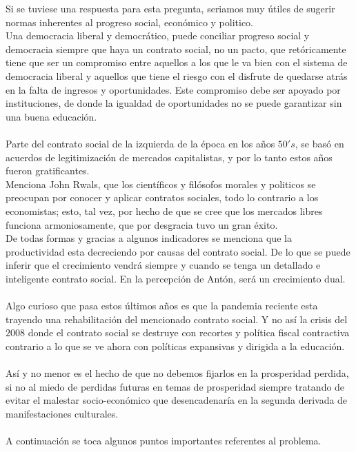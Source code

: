 \begin{multicols}{2}
Si se tuviese una respuesta para esta pregunta, seriamos muy útiles de sugerir normas inherentes al progreso social, económico y politico. \\
Una democracia liberal y democrático, puede conciliar progreso social y democracia siempre que haya un contrato social, no un pacto, que retóricamente tiene que ser un compromiso entre aquellos a los que le va bien con el sistema de democracia liberal y aquellos que tiene el riesgo con el disfrute de quedarse atrás en la falta de ingresos y oportunidades. Este compromiso debe ser apoyado por instituciones, de donde la igualdad de oportunidades no se puede garantizar sin una buena educación. \\\\
Parte del contrato social de la izquierda de la época en los años $50's$, se basó en acuerdos de legitimización de mercados capitalistas, y por lo tanto estos años fueron gratificantes. \\
Menciona John Rwals, que los científicos y filósofos morales y politicos se preocupan por conocer y aplicar contratos sociales, todo lo contrario a los economistas; esto, tal vez, por hecho de que se cree que los mercados libres funciona armoniosamente, que por desgracia tuvo un gran éxito.\\
De todas formas y gracias a algunos indicadores se menciona que la productividad esta decreciendo por causas del contrato social. De lo que se puede inferir que el crecimiento vendrá siempre y cuando se tenga un detallado e inteligente contrato social. En la percepción de Antón, será un crecimiento dual.\\\\
Algo curioso que pasa estos últimos años es que la pandemia reciente esta trayendo una rehabilitación del mencionado contrato social. Y no así la crisis del $2008$ donde el contrato social se destruye con recortes y política fiscal contractiva contrario a lo que se ve ahora con políticas expansivas y dirigida a la educación.\\\\
Así y no menor es el hecho de que no debemos fijarlos en la prosperidad perdida, si no al miedo de perdidas futuras en temas de prosperidad siempre tratando de evitar el malestar socio-económico que desencadenaría en la segunda derivada de manifestaciones culturales.\\\\
A continuación se toca algunos puntos importantes referentes al problema.


\end{multicols}

